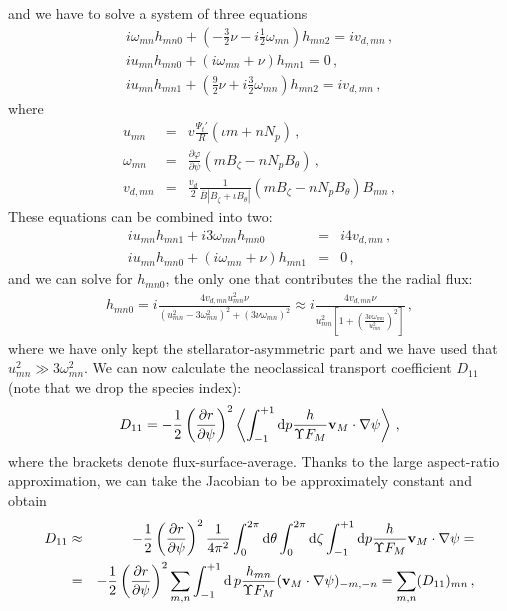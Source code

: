 and we have to solve a system of three equations
\begin{eqnarray}
i\omega_{mn}h_{mn0} + \left(-\frac{3}{2}\nu -i\frac{1}{2}\omega_{mn}\right)h_{mn2} = iv_{d,mn}\,,\nonumber\\
iu_{mn}h_{mn0} + (i\omega_{mn}+\nu) h_{mn1} = 0 \,,\nonumber\\
iu_{mn}h_{mn1}+\left(\frac{9}{2}\nu+i\frac{3}{2}\omega_{mn}\right)h_{mn2} = iv_{d,mn}\,,
\end{eqnarray}
where
\begin{eqnarray}
u_{mn} &=& v\frac{\Psi_t'}{R}(\iota m  + nN_p)\,,\nonumber\\
\omega_{mn} &=& \frac{\partial \varphi}{\partial\psi}(m B_\zeta-nN_p B_\theta)\,,\nonumber\\
v_{d,mn} & = &\frac{v_d}{2} \frac{1}{\overline{B}|B_\zeta+\iota B_\theta|} (m B_\zeta-n N_p B_\theta) B_{mn}  \,,
\end{eqnarray}
These equations can be combined into two:
\begin{eqnarray}
iu_{mn}h_{mn1} +i3\omega_{mn}h_{mn0} &=& i4v_{d,mn}\,,\nonumber\\
iu_{mn}h_{mn0} + (i\omega_{mn}+\nu) h_{mn1} &=& 0 \,,
\end{eqnarray}
and we can solve for $h_{mn0}$, the only one that contributes the the radial flux:
\begin{eqnarray}
h_{mn0} =i\frac{4v_{d,mn}u_{mn}^2\nu}{(u_{mn}^2-3\omega_{mn}^2)^2+(3\nu\omega_{mn})^2}\approx i\frac{4v_{d,mn}\nu}{u_{mn}^2\left[1+\left(\frac{3\nu\omega_{mn}}{u_{mn}^2}\right)^2\right]}\,,
\end{eqnarray}
where we have only kept the stellarator-asymmetric part and we have used that $u_{mn}^2\gg 3\omega_{mn}^2$. We can now calculate the neoclassical transport coefficient $D_{11}$ (note that we drop the species index):
\begin{equation}
D_{11}= -\frac{1}{2}\left(\frac{\partial r}{\partial\psi}\right)^2\left\langle{\int_{-1}^{+1}\mathrm{d}p \frac{h}{\Upsilon F_M} {\mathbf{v}}_M\cdot\mathbf{\nabla}\psi}\right\rangle\,,
\end{equation}
where the brackets denote flux-surface-average. Thanks to the large aspect-ratio approximation, we can take the Jacobian to be approximately constant and obtain 
\begin{eqnarray}
D_{11} &\approx& -\frac{1}{2}\left(\frac{\partial r}{\partial\psi}\right)^2\frac{1}{4\pi^2}\int_0^{2\pi}\mathrm{d}\theta\int_0^{2\pi}\mathrm{d}\zeta\int_{-1}^{+1}\mathrm{d}p \frac{h}{\Upsilon F_M} {\mathbf{v}}_M\cdot\mathbf{\nabla} \psi = \nonumber \\ &=& -\frac{1}{2}\left(\frac{\partial r}{\partial\psi}\right)^2 \sum_{m,n}\int_{-1}^{+1}\mathrm{d}\,p \frac{h_{mn}}{\Upsilon F_M}({\mathbf{v}}_M\cdot\mathbf{\nabla}\psi)_{-m,-n}  = \sum_{m,n}(D_{11})_{mn}\,,
\end{eqnarray}
